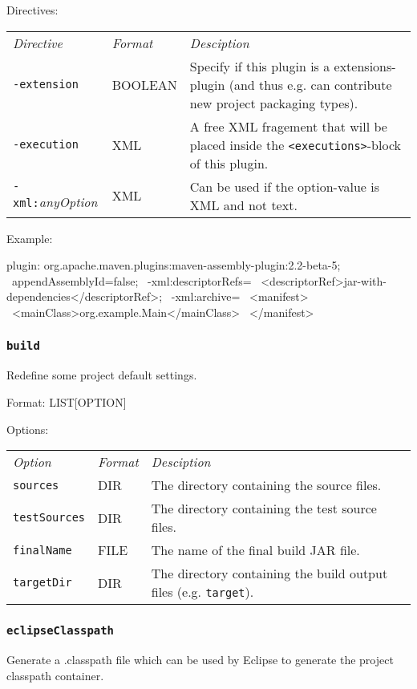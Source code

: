 \documentclass[a4paper,12pt,english,oneside,halfparskip]{scrartcl}
\newcommand{\code}[1]{\texttt{#1}}
\begin{document}
Directives: 

\begin{tabular}{llp{}}
\emph{Directive} & \emph{Format} & \emph{Desciption} \\
\code{-extension} & BOOLEAN & Specify if this plugin is a extensions-plugin (and thus e.g. can contribute new project packaging types). \\
\code{-execution} & XML & A free XML fragement that will be placed inside the \code{<executions>}-block of this plugin. \\
\code{-xml:}\emph{anyOption} & XML & Can be used if the option-value is XML and not text. \\
\end{tabular}

Example:
\begin{Cmdline}
plugin: org.apache.maven.plugins:maven-assembly-plugin:2.2-beta-5; \
 appendAssemblyId=false; \
 -xml:descriptorRefs= \
    <descriptorRef>jar-with-dependencies</descriptorRef>; \
 -xml:archive= \
    <manifest> \
      <mainClass>org.example.Main</mainClass> \
    </manifest>
\end{Cmdline}


\subsubsection{\code{build}}

Redefine some project default settings.

Format: LIST[OPTION]

Options:

\begin{tabular}{llp{}}
\emph{Option} & \emph{Format} & \emph{Desciption} \\
\code{sources} &  DIR & The directory containing the source files. \\
\code{testSources} &  DIR & The directory containing the test source files. \\
\code{finalName} &  FILE & The name of the final build JAR file. \\
\code{targetDir} & DIR & The directory containing the build output files (e.g. \code{target}).
\end{tabular}


\subsubsection{\code{eclipseClasspath}}

Generate a .classpath file which can be used by Eclipse to generate the project classpath container.
\end{document}

